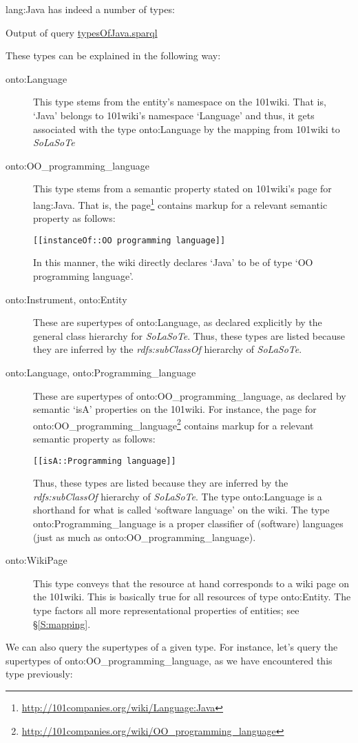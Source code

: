 \documentclass{article}
\newcommand{\uri}[1]{\textsf{#1}}
\newcommand{\ooo}[1]{\textsf{101#1}}%
\newcommand{\solasote}{{\itshape\textsf{SoLaSoTe}}}
\newcommand{\completeOutput}[1]{%

\medskip

\noindent
\begin{boxedminipage}{\hsize}
\hfill{}Output of query \underline{#1.sparql}

\end{boxedminipage}
\medskip
}
\begin{document}
\noindent
\uri{lang:Java} has indeed a number of types:

\completeOutput{typesOfJava}

\noindent
These types can be explained in the following way:
%
\begin{description}
%
\item[\uri{onto:Language}] This type stems from the entity's namespace
  on the \ooo{wiki}. That is, `Java' belongs to \ooo{wiki}'s namespace
  `Language' and thus, it gets associated with the type \uri{onto:Language}
  by the mapping from \ooo{wiki} to \solasote
%
\item[\uri{onto:OO\_programming\_language}] This type stems from a
  semantic property stated on \ooo{wiki}'s page for \uri{lang:Java}. That
  is, the
  page\footnote{\url{http://101companies.org/wiki/Language:Java}}
  contains markup for a relevant semantic property as follows:
\begin{center}
\begin{BVerbatim}
[[instanceOf::OO programming language]]
\end{BVerbatim}
\end{center}
\noindent
In this manner, the wiki directly declares `Java' to be of type `OO
programming language'.
%
\item[\uri{onto:Instrument}, \uri{onto:Entity}] These are supertypes
  of \uri{onto:Language}, as declared explicitly by the general class
  hierarchy for \solasote. Thus, these types are listed because they
  are inferred by the \emph{rdfs:subClassOf} hierarchy of \solasote.
%
\item[\uri{onto:Language}, \uri{onto:Programming\_language}]
  These are supertypes of \uri{onto:OO\_programming\_language}, as
  declared by semantic `isA' properties on the \ooo{wiki}. For
  instance, the
  page for \uri{onto:OO\_programming\_language}\footnote{\url{http://101companies.org/wiki/OO_programming_language}}
  contains markup for a relevant semantic property as follows:
\begin{center}
\begin{BVerbatim}
[[isA::Programming language]]
\end{BVerbatim}
\end{center}
\noindent
Thus, these types are listed because they are inferred by the
\emph{rdfs:subClassOf} hierarchy of \solasote. The type
\uri{onto:Language} is a shorthand for what is called `software
language' on the wiki. The type \uri{onto:Programming\_language} is a
proper classifier of (software) languages (just as much as
\uri{onto:OO\_programming\_language}).
%
\item[\uri{onto:WikiPage}] This type conveys that the resource at hand
  corresponds to a wiki page on the \ooo{wiki}. This is basically
  true for all resources of type \uri{onto:Entity}. The type factors
  all more representational properties of entities; see
  \S\ref{S:mapping}.
%
\end{description}
%
We can also query the supertypes of a given type. For instance, let's
query the supertypes of \uri{onto:OO\_programming\_language}, as we
have encountered this type previously:
\end{document}
